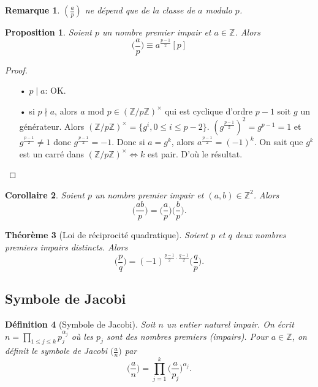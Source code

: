 \documentclass[12pt]{report}
\newtheorem{thm}{Théorème}[chapter]
\newtheorem*{rem}{Remarque}
\newtheorem{Def}[thm]{Définition}
\newtheorem{Prop}[thm]{Proposition}
\newtheorem{Cor}[thm]{Corollaire}
\begin{document}
\begin{rem}
$(\tfrac{a}{p})$ ne dépend que de la classe de $a$ modulo $p$.
\end{rem}

\begin{Prop}
Soient $p$ un nombre premier impair et $a \in \mathbb{Z}$. Alors
\begin{equation*}
\Big( \frac{a}{p} \Big) \equiv a^{\tfrac{p-1}{2}}[p]
\end{equation*}
\end{Prop}

\begin{proof}\
\begin{itemize}
\item[•]$p \mid a$: OK.
\item[•] si $p \nmid a$, alors $a$ mod $p \in (\mathbb{Z}/p\mathbb{Z})^{\times}$ qui est cyclique d'ordre $p-1$ soit $g$ un générateur. Alors $(\mathbb{Z}/p\mathbb{Z})^{\times}= \{ g^i, 0 \leq i \leq p-2 \}$. $(g^{\tfrac{p-1}{2}})^2=g^{p-1}=1$ et $g^{\tfrac{p-1}{2}}\neq 1$ donc $g^{\tfrac{p-1}{2}}=-1$. Donc si $a=g^k$, alors $a^{\tfrac{p-1}{2}}=(-1)^k$. On sait que $g^k$ est un carré dans $(\mathbb{Z}/p\mathbb{Z})^{\times} \Longleftrightarrow k$ est pair. D'où le résultat.
\end{itemize}
\end{proof}

\begin{Cor}
Soient $p$ un nombre premier impair et $(a,b) \in \mathbb{Z}^2$. Alors 
$$  \Big( \frac{ab}{p} \Big)=  \Big( \frac{a}{p} \Big)\Big(  \frac{b}{p}\Big)  .  $$
\end{Cor}

\begin{thm}[Loi de réciprocité quadratique] Soient $p$ et $q$ deux nombres premiers impairs distincts. Alors
$$    \Big(  \frac{p}{q}\Big)=(-1)^{\tfrac{p-1}{2}\cdot \tfrac{q-1}{2}}\Big(  \frac{q}{p}\Big).   $$
\end{thm}


\subsection{Symbole de Jacobi}

\begin{Def}[Symbole de Jacobi]
Soit $n$ un entier naturel impair. On écrit $n=\prod_{1 \leq j \leq k}p_j^{\alpha_j}$ où les $p_j$ sont des nombres premiers (impairs). Pour $a \in \mathbb{Z}$, on définit le symbole de Jacobi $\big(  \tfrac{a}{n}\big)$ par
$$ \Big(  \frac{a}{n}\Big) =\prod_{j=1}^k \Big(  \frac{a}{p_j}\Big)^{\alpha_j}  .  $$
\end{Def}
\end{document}
